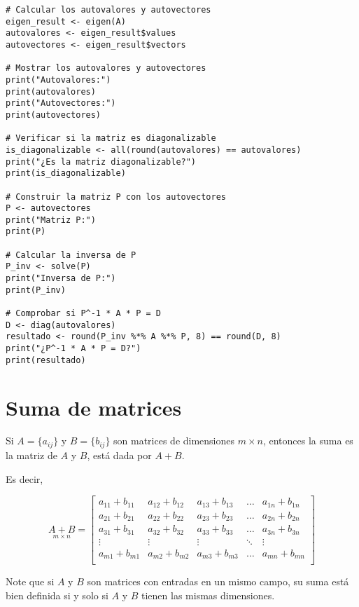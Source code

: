 \begin{}
\begin{verbatim}
# Calcular los autovalores y autovectores
eigen_result <- eigen(A)
autovalores <- eigen_result$values
autovectores <- eigen_result$vectors

# Mostrar los autovalores y autovectores
print("Autovalores:")
print(autovalores)
print("Autovectores:")
print(autovectores)

# Verificar si la matriz es diagonalizable
is_diagonalizable <- all(round(autovalores) == autovalores)
print("¿Es la matriz diagonalizable?")
print(is_diagonalizable)

# Construir la matriz P con los autovectores
P <- autovectores
print("Matriz P:")
print(P)

# Calcular la inversa de P
P_inv <- solve(P)
print("Inversa de P:")
print(P_inv)

# Comprobar si P^-1 * A * P = D
D <- diag(autovalores)
resultado <- round(P_inv %*% A %*% P, 8) == round(D, 8)
print("¿P^-1 * A * P = D?")
print(resultado)   
\end{verbatim}


\section{Suma de matrices} 

\begin{definition} Si $A = \{a_{ij}\}$ y $B = \{b_{ij}\}$ son matrices de dimensiones $m\times n$, entonces la suma es la matriz de $A$ y $B$, está dada por $A+B$.  
\end{definition}
Es decir, 

$$
\underset{m \times n}{A+B}=\begin{bmatrix}
    a_{11}+b_{11} & a_{12}+b_{12} & a_{13}+b_{13} & \dots & a_{1n}+b_{1n} \\
    a_{21}+b_{21} & a_{22}+b_{22} & a_{23}+b_{23} & \dots & a_{2n}+b_{2n} \\
    a_{31}+b_{31} & a_{32}+b_{32} & a_{33}+b_{33} & \dots & a_{3n}+b_{3n} \\
    \vdots & \vdots & \vdots & \ddots & \vdots \\
    a_{m1}+b_{m1} & a_{m2}+b_{m2} & a_{m3}+b_{m3} & \dots & a_{mn}+b_{mn} \\
  \end{bmatrix}
$$

\begin{remark}
Note que si \( A \) y \( B \) son matrices con entradas en un mismo campo, su suma está bien definida si y solo si \( A \) y \( B \) tienen las mismas dimensiones.
    

\end{remark}
\end{}
